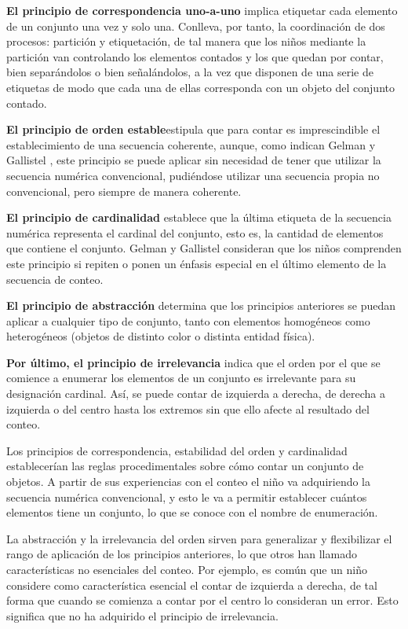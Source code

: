 \documentclass{article}
\begin{document}
\textbf{El principio de correspondencia uno-a-uno}  implica etiquetar cada elemento de un conjunto una vez y solo una. Conlleva, por tanto, la coordinación de dos procesos: partición y etiquetación, de tal manera que los niños mediante la partición van controlando los elementos contados y los que quedan por contar, bien separándolos o bien señalándolos, a la vez que disponen de una serie de etiquetas de modo que cada una de ellas corresponda con un objeto del conjunto contado. 

\textbf{El principio de orden estable}estipula que para contar es imprescindible el establecimiento de una secuencia coherente, aunque, como indican Gelman y Gallistel \cite{german1978child}, este principio se puede aplicar sin necesidad de tener que utilizar la secuencia numérica convencional, pudiéndose utilizar una secuencia propia no convencional, pero siempre de manera coherente.

\textbf{El principio de cardinalidad} establece que la última etiqueta de la secuencia numérica representa el cardinal del conjunto, esto es, la cantidad de elementos que contiene el conjunto. Gelman y Gallistel \cite{german1978child} consideran que los niños comprenden este principio si repiten o ponen un énfasis especial en el último elemento de la secuencia de conteo.

\textbf{El principio de abstracción} determina que los principios anteriores se puedan aplicar a cualquier tipo de conjunto, tanto con elementos homogéneos como heterogéneos (objetos de distinto color o distinta entidad física).

\textbf{Por último, el principio de irrelevancia }indica que el orden por el que se comience a enumerar los elementos de un conjunto es irrelevante para su designación cardinal. Así, se puede contar de izquierda a derecha, de derecha a izquierda o del centro hasta los extremos sin que ello afecte al resultado del conteo.

Los principios de correspondencia, estabilidad del orden y cardinalidad establecerían las reglas procedimentales sobre cómo contar un conjunto de objetos. A partir de sus experiencias con el conteo el niño va adquiriendo la secuencia numérica convencional, y esto le va a permitir establecer cuántos elementos tiene un conjunto, lo que se conoce con el nombre de enumeración.

La abstracción y la irrelevancia del orden sirven para generalizar y flexibilizar el rango de aplicación de los principios anteriores, lo que otros han llamado características no esenciales del conteo. Por ejemplo, es común que un niño considere como característica esencial el contar de izquierda a derecha, de tal forma que cuando se comienza a contar por el centro lo consideran un error. Esto significa que no ha adquirido el principio de irrelevancia.
\end{document}
